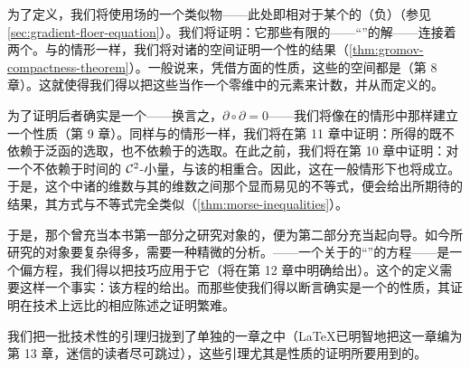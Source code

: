 为了定义\trDifferential，我们将使用\trPseudogradient{}场的一个类似物——此处即\trActionFunctional{}相对于某个\trMetric{}的（负）\trGradient（参见\cref{sec:gradient-floer-equation}）。我们将证明：它那些\trEnergy{}有限的\trTrajectory——“\trFloerEquation”的解——连接着两个\trCriticalPoint。与\trMorse{}的情形一样，我们将对诸\trTrajectory{}的空间证明一个\trCompact{}性的结果（\cref{thm:gromov-compactness-theorem}）。一般说来，凭借\trTransversality{}方面的性质，这些\trTrajectory{}的空间都是\trManifold（第 8 章）。这就使得我们得以把这些\trTrajectory{}当作一个零维\trManifold{}中的元素来计数，并从而定义\trFloerComplex{}的\trDifferential。

为了证明后者确实是一个\trComplex——换言之，$\partial\circ\partial=0$——我们将像在\trMorse{}的情形中那样建立一个\trGluing{}性质（第 9 章）。同样与\trMorse{}的情形一样，我们将在第 11 章中证明：所得\trComplex{}的\trHomology{}既不依赖于泛函的选取，也不依赖于\trVectorField{}的选取。在此之前，我们将在第 10 章中证明：对一个不依赖于时间的 $\mathcal{C}^2$-小\trHamiltonian{}量，\trFloerHomology{}与该\trManifold{}的\trMorseHomology{}相重合。因此，这在一般情形下也将成立。于是，这个\trComplex{}中诸\trVectorSpace{}的维数与其\trHomology{}的维数之间那个显而易见的不等式，便会给出所期待的结果，其方式与\trMorse{}不等式完全类似（\cref{thm:morse-inequalities}）。

于是，那个曾充当本书第一部分之研究对象的\trMorseComplex，便为第二部分充当起向导。如今所研究的对象要复杂得多，需要一种精微的分析。\trFloerEquation——一个关于\trActionFunctional{}的“\trGradient\trTrajectory”的\trDifferential{}方程——是一个偏\trDifferential{}方程，我们得以把\trEllipticRegularity{}技巧应用于它（将在第 12 章中明确给出）。这个\trComplex{}的定义需要这样一个事实：该方程的\trLinearization{}给出\trFredholmOperator。而那些使我们得以断言\trFloerComplex{}确实是一个\trComplex{}的性质，其证明在技术上远比\trMorseComplex{}的相应陈述之证明繁难。

我们把一批技术性的引理归拢到了单独的一章之中（\LaTeX{}已明智地把这一章编为第 13 章，迷信的读者尽可跳过），这些引理尤其是\trGluing{}性质的证明所要用到的。
